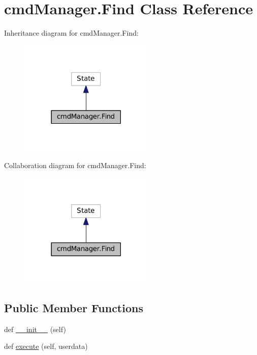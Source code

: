 \hypertarget{classcmdManager_1_1Find}{}\section{cmd\+Manager.\+Find Class Reference}
\label{classcmdManager_1_1Find}


Inheritance diagram for cmd\+Manager.\+Find\+:\nopagebreak
\begin{figure}[H]
\begin{center}
\leavevmode
\includegraphics[width=182pt]{classcmdManager_1_1Find__inherit__graph}
\end{center}
\end{figure}


Collaboration diagram for cmd\+Manager.\+Find\+:\nopagebreak
\begin{figure}[H]
\begin{center}
\leavevmode
\includegraphics[width=182pt]{classcmdManager_1_1Find__coll__graph}
\end{center}
\end{figure}
\subsection*{Public Member Functions}
\begin{DoxyCompactItemize}
\item 
def \hyperlink{classcmdManager_1_1Find_ac1b5934dd9654da40ee17c6b6680f7b3}{\+\_\+\+\_\+init\+\_\+\+\_\+} (self)
\item 
def \hyperlink{classcmdManager_1_1Find_abd9e8b1f15ff00ebf80384840ec4591b}{execute} (self, userdata)
\end{DoxyCompactItemize}
